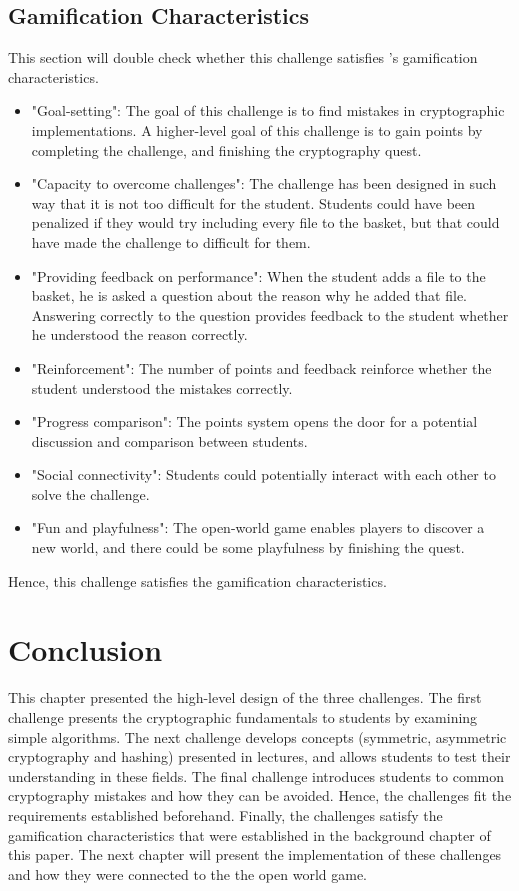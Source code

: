 \documentclass{l4proj}
\begin{document}
\subsection{Gamification Characteristics}

This section will double check whether this challenge satisfies \citet{cugelman_gamification:_2013}'s
gamification characteristics.
\begin{itemize}
    \item "Goal-setting": The goal of this challenge is to find mistakes in cryptographic implementations. 
    A higher-level goal of this challenge is to gain points by completing the challenge, 
    and finishing the cryptography quest.
    \item "Capacity to overcome challenges": The challenge has been designed in such way 
    that it is not too difficult for the student. 
    Students could have been penalized if they would try including every file to the basket, but that
    could have made the challenge to difficult for them.
    \item "Providing feedback on performance": When the student adds a file to the basket, he is asked
    a question about the reason why he added that file. Answering correctly to the question provides 
    feedback to the student whether he understood the reason correctly.
    \item "Reinforcement": The number of points and feedback reinforce whether the student understood the mistakes correctly.
    \item "Progress comparison": The points system opens the door for a potential discussion and comparison between students.
    \item "Social connectivity": Students could potentially interact with each other to solve the challenge.
    \item "Fun and playfulness": The open-world game enables players to discover a new world, 
    and there could be some playfulness by finishing the quest.
\end{itemize}
Hence, this challenge satisfies the gamification characteristics.

\section{Conclusion}

This chapter presented the high-level design of the three challenges.
The first challenge presents the cryptographic fundamentals to students by examining simple algorithms.
The next challenge develops concepts (symmetric, asymmetric cryptography and hashing) presented in lectures,
and allows students to test their understanding in these fields.
The final challenge introduces students to common cryptography mistakes and how they can be avoided.
Hence, the challenges fit the requirements established beforehand.
Finally, the challenges satisfy the gamification characteristics that were established in the background chapter of this paper.
The next chapter will present the implementation of these challenges 
and how they were connected to the the open world game.
\end{document}

